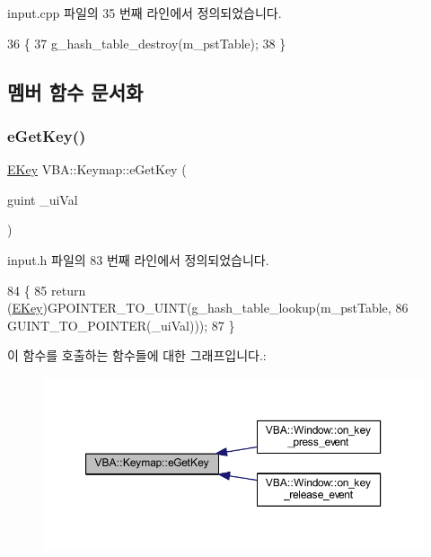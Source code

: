 input.\+cpp 파일의 35 번째 라인에서 정의되었습니다.


\begin{DoxyCode}
36 \{
37   g\_hash\_table\_destroy(m\_pstTable);
38 \}
\end{DoxyCode}


\subsection{멤버 함수 문서화}
\mbox{\label{class_v_b_a_1_1_keymap_a486ec30d582382b892c6e81588baa03c}} 
\subsubsection{\texorpdfstring{e\+Get\+Key()}{eGetKey()}}
{\footnotesize\ttfamily \mbox{\hyperlink{class_v_b_a_a5839ea5408735bd8ce070c4c245750cc}{E\+Key}} V\+B\+A\+::\+Keymap\+::e\+Get\+Key (\begin{DoxyParamCaption}\item[{guint}]{\+\_\+ui\+Val }\end{DoxyParamCaption})\hspace{0.3cm}{\ttfamily [inline]}}



input.\+h 파일의 83 번째 라인에서 정의되었습니다.


\begin{DoxyCode}
84 \{
85   \textcolor{keywordflow}{return} (\mbox{\hyperlink{class_v_b_a_a5839ea5408735bd8ce070c4c245750cc}{EKey}})GPOINTER\_TO\_UINT(g\_hash\_table\_lookup(m\_pstTable,
86                                                     GUINT\_TO\_POINTER(\_uiVal)));
87 \}
\end{DoxyCode}
이 함수를 호출하는 함수들에 대한 그래프입니다.\+:
\nopagebreak
\begin{figure}[H]
\begin{center}
\leavevmode
\includegraphics[width=350pt]{class_v_b_a_1_1_keymap_a486ec30d582382b892c6e81588baa03c_icgraph}
\end{center}
\end{figure}
\mbox{\label{class_v_b_a_1_1_keymap_a3ab4ca7dcf977067ab7ce631fe6aab57}} 
